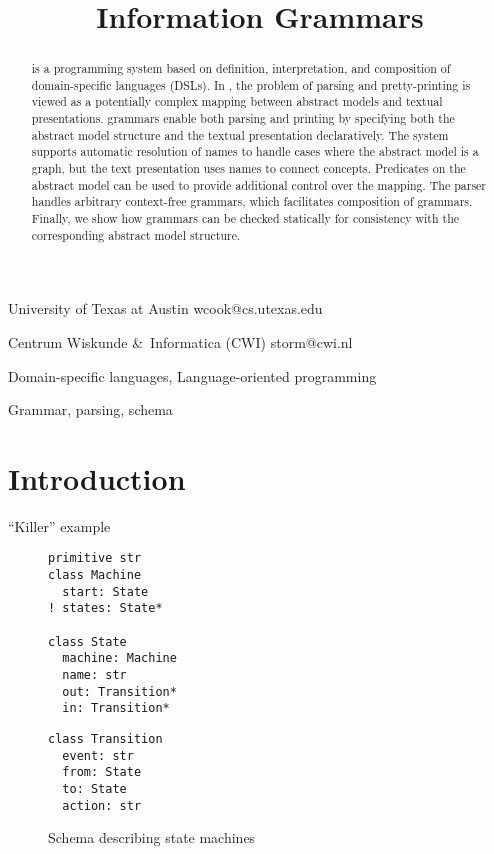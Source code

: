 \documentclass[preprint,10pt]{sigplanconf}
\begin{document}

\title{Information Grammars} %

%
{University of Texas at Austin}%
{wcook@cs.utexas.edu}

%
{Centrum Wiskunde \&\ Informatica (CWI)}%
{storm@cwi.nl}
\maketitle

\begin{abstract}
  \enso is a programming system based on definition, interpretation, and composition of
  domain-specific languages (DSLs). In \enso, the problem of parsing and pretty-printing
  is viewed as a potentially complex mapping between abstract models and textual presentations.
  \enso grammars enable both parsing and printing by specifying both the abstract model
  structure and the textual presentation declaratively. The system supports automatic
  resolution of names to handle cases where the abstract model is a graph, but the 
  text presentation uses names to connect concepts. Predicates on the abstract model 
  can be used to provide additional control over the mapping. The \enso parser handles arbitrary
  context-free grammars, which facilitates composition of grammars. 
  Finally, we show how grammars can be checked statically for consistency with the
  corresponding abstract model structure.
\end{abstract}


\terms
Domain-specific languages, Language-oriented programming

\keywords
Grammar, parsing, schema


\section{Introduction}

``Killer'' example

\begin{figure}
\begin{minipage}[t]{0.5\linewidth}
\begin{lstlisting}[language=ensoschema]
primitive str
class Machine
  start: State
! states: State*

class State
  machine: Machine
  name: str
  out: Transition*
  in: Transition*
\end{lstlisting}
\end{minipage}
\begin{minipage}[t]{0.4\linewidth}
\begin{lstlisting}[language=ensoschema]
class Transition
  event: str
  from: State
  to: State
  action: str
\end{lstlisting}
\end{minipage}
\caption{Schema describing state machines}
\end{figure}
\end{document}
